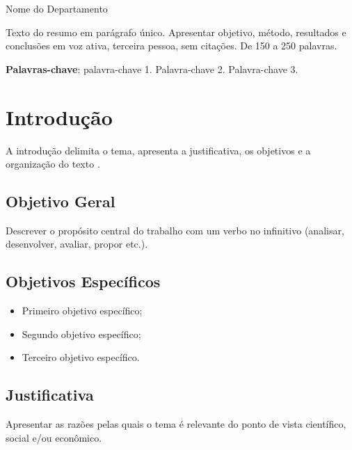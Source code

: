 \documentclass[
  12pt,
  a4paper,
  oneside,
  brazil,
  chapter=TITLE
]{abntex2}
\renewcommand{\imprimircapa}{%
  \begin{capa}
    \centering
    {\bfseries\large\MakeUppercase{\imprimirinstituicao}\par}
    {\large Nome do Departamento\par}
    \vspace*{\fill}
    {\large\MakeUppercase{\imprimirautor}\par}
    \vspace*{\fill}
    {\bfseries\large\MakeUppercase{\imprimirtitulo}\par}
    \vspace*{\fill}
    {\large\MakeUppercase{\imprimirlocal}\par}
    {\large\imprimirdata\par}
  \end{capa}
}
\renewcommand{\imprimirfolhaderosto}{%
  \begin{folhaderosto}
    \centering
    {\large\MakeUppercase{\imprimirautor}\par}
    \vspace*{\fill}
    {\bfseries\large\MakeUppercase{\imprimirtitulo}\par}
    \vspace*{\fill}
    {\noindent\hspace{.45\textwidth}%
    \begin{minipage}{.55\textwidth}
      \SingleSpacing\small\imprimirpreambulo
    \end{minipage}\par}
    \vspace*{\fill}
    {\large\MakeUppercase{\imprimirlocal}\par}
    {\large\imprimirdata\par}
  \end{folhaderosto}
}
\begin{document}
\OnehalfSpacing
\frenchspacing

\pretextual

\imprimircapa
\imprimirfolhaderosto

\begin{resumo}
\SingleSpacing
Texto do resumo em parágrafo único. Apresentar objetivo,
método, resultados e conclusões em voz ativa, terceira pessoa,
sem citações. De 150 a 250 palavras.

\vspace{\onelineskip}
\noindent
\textbf{Palavras-chave}: palavra-chave 1. Palavra-chave 2. Palavra-chave 3.
\end{resumo}

\tableofcontents*
\cleardoublepage

\textual
\pagestyle{abntpaginas}

\chapter{Introdução}
\label{cap:introducao}

A introdução delimita o tema, apresenta a justificativa, os
objetivos e a organização do texto \cite{ABNT14724:2011}.

\section{Objetivo Geral}

Descrever o propósito central do trabalho com um verbo no
infinitivo (analisar, desenvolver, avaliar, propor etc.).

\section{Objetivos Específicos}

\begin{itemize}
  \item Primeiro objetivo específico;
  \item Segundo objetivo específico;
  \item Terceiro objetivo específico.
\end{itemize}

\section{Justificativa}

Apresentar as razões pelas quais o tema é relevante do ponto
de vista científico, social e/ou econômico.
\end{document}
